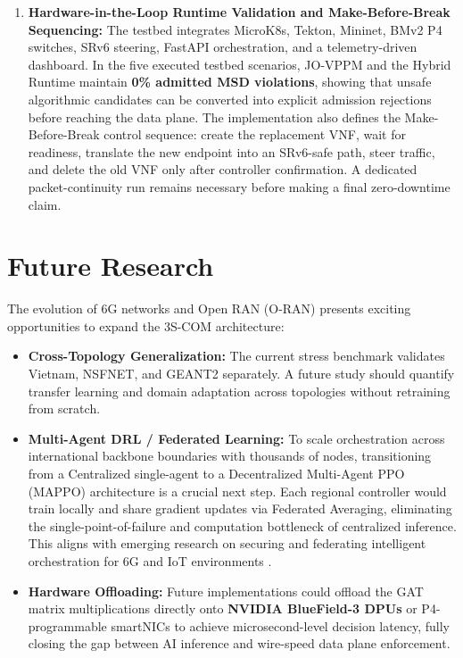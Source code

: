 \documentclass[12pt, a4paper, reqno, oneside]{book}
\begin{document}
\begin{enumerate}
    \item \textbf{Hardware-in-the-Loop Runtime Validation and Make-Before-Break Sequencing:} The testbed integrates MicroK8s, Tekton, Mininet, BMv2 P4 switches, SRv6 steering, FastAPI orchestration, and a telemetry-driven dashboard. In the five executed testbed scenarios, JO-VPPM and the Hybrid Runtime maintain \textbf{0\% admitted MSD violations}, showing that unsafe algorithmic candidates can be converted into explicit admission rejections before reaching the data plane. The implementation also defines the Make-Before-Break control sequence: create the replacement VNF, wait for readiness, translate the new endpoint into an SRv6-safe path, steer traffic, and delete the old VNF only after controller confirmation. A dedicated packet-continuity run remains necessary before making a final zero-downtime claim.
\end{enumerate}

\section{Future Research}
The evolution of 6G networks and Open RAN (O-RAN) presents exciting opportunities to expand the 3S-COM architecture:
\begin{itemize}
    \item \textbf{Cross-Topology Generalization:} The current stress benchmark validates Vietnam, NSFNET, and GEANT2 separately. A future study should quantify transfer learning and domain adaptation across topologies without retraining from scratch.
    \item \textbf{Multi-Agent DRL / Federated Learning:} To scale orchestration across international backbone boundaries with thousands of nodes, transitioning from a Centralized single-agent to a Decentralized Multi-Agent PPO (MAPPO) architecture is a crucial next step. Each regional controller would train locally and share gradient updates via Federated Averaging, eliminating the single-point-of-failure and computation bottleneck of centralized inference. This aligns with emerging research on securing and federating intelligent orchestration for 6G and IoT environments \cite{kantarci2025federated, wang2022securing}.
    \item \textbf{Hardware Offloading:} Future implementations could offload the GAT matrix multiplications directly onto \textbf{NVIDIA BlueField-3 DPUs} or P4-programmable smartNICs to achieve microsecond-level decision latency, fully closing the gap between AI inference and wire-speed data plane enforcement.
\end{itemize}
\end{document}
